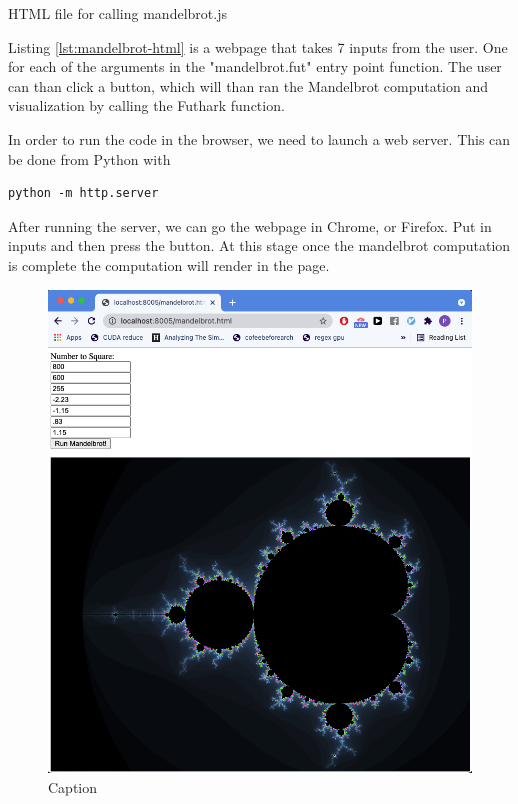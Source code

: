 \documentclass[11pt]{book}
\begin{document}
\begin{listing}[H] 
        \inputminted[fontsize=\small,baselinestretch=0.5,linenos]{HTML}{code/examples/HTML/mandelbrot.js}
        \caption{HTML file for calling mandelbrot.js}
        \label{lst:mandelbrot-html}    
\end{listing}

Listing \ref{lst:mandelbrot-html} is a webpage that takes 7 inputs from the user. One for each of the arguments in the "mandelbrot.fut" entry point function. The user can than click a button, which will than ran the Mandelbrot computation and visualization by calling the Futhark function.


In order to run the code in the browser, we need to launch a web server. This can be done from Python with
\begin{verbatim}
python -m http.server
\end{verbatim}
After running the server, we can go the webpage in Chrome, or Firefox. Put in inputs and then press the button. At this stage once the mandelbrot computation is complete the computation will render in the page.
\begin{figure}[htbp]
    \centering
    \includegraphics[scale=0.3]{figures/mandelbrot.png}
    \caption{Caption}
    \label{fig:mandelbrot}
\end{figure}
\end{document}
